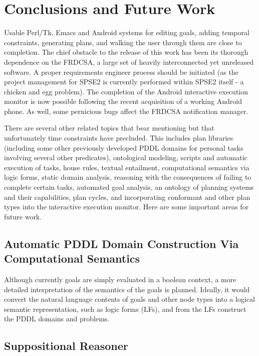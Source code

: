 \documentclass[letterpaper]{article}
\begin{document}
\section{Conclusions and Future Work}

\noindent Usable Perl/Tk, Emacs and Android systems for editing goals,
adding temporal constraints, generating plans, and walking the user
through them are close to completion.  The chief obstacle to the
release of this work has been its thorough dependence on the FRDCSA, a
large set of heavily interconnected yet unreleased software.  A proper
requirements engineer process should be initiated (as the project
management for SPSE2 is currently performed within SPSE2 itself - a
chicken and egg problem).  The completion of the Android interactive
execution monitor is now possible following the recent acquisition of
a working Android phone.  As well, some pernicious bugs affect the
FRDCSA notification manager.

There are several other related topics that bear mentioning but that
unfortunately time constraints have precluded.  This includes plan
libraries (including some other previously developed PDDL domains for
personal tasks involving several other predicates), ontological
modeling, scripts and automatic execution of tasks, house rules,
textual entailment, computational semantics via logic forms, static
domain analysis, reasoning with the consequences of failing to
complete certain tasks, automated goal analysis, an ontology of
planning systems and their capabilities, plan cycles, and
incorporating conformant and other plan types into the interactive
execution monitor.  Here are some important areas for future work.

\subsection{Automatic PDDL Domain Construction Via Computational Semantics}

\noindent Although currently goals are simply evaluated in a boolean
context, a more detailed interpretation of the semantics of the goals
is planned.  Ideally, it would convert the natural language contents
of goals and other node types into a logical semantic representation,
such as logic forms (LFs), and from the LFs construct the PDDL domains
and problems.

\subsection{Suppositional Reasoner}
\end{document}
